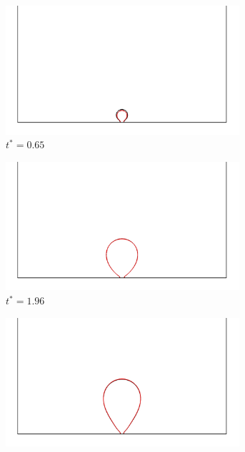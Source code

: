 \begin{figure}[htb]
    \centering
    \begin{subfigure}[t]{0.45\textwidth}
        \centering
        \includegraphics[width=0.95\textwidth]{Imagenes/HetBoiling/GridIndep_1/20}
        \caption{$t^*=0.65$}
    \end{subfigure}
    \begin{subfigure}[t]{0.45\textwidth}
        \centering
        \includegraphics[width=0.95\textwidth]{Imagenes/HetBoiling/GridIndep_1/60}
        \caption{$t^* = 1.96$}
    \end{subfigure}
    \begin{subfigure}[t]{0.45\textwidth}
        \centering
        \includegraphics[width=0.95\textwidth]{Imagenes/HetBoiling/GridIndep_1/90}

\end{subfigure}
\end{figure}
